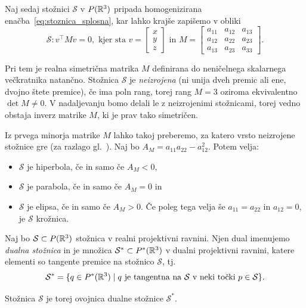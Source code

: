 Naj sedaj stožnici $\mathcal{S}$ v $P(\mathbb R^3)$ pripada homogenizirana enačba~\eqref{eq:stoznica_splosna}, kar lahko krajše zapišemo v obliki
\begin{equation}
    \label{eq:stoznica_matricna}
    \mathcal{S}: v^\intercal M v = 0,
    \text{ kjer sta } v =
    \begin{bmatrix}
        x\\
        y\\
        z
    \end{bmatrix}
    \text{ in } M =
    \begin{bmatrix}
        a_{11} & a_{12} & a_{13}\\
        a_{12} & a_{22} & a_{23}\\
        a_{13} & a_{23} & a_{33}
    \end{bmatrix}.
\end{equation}

Pri tem je realna simetrična matrika $M$ definirana do neničelnega skalarnega večkratnika natančno. Stožnica $\mathcal{S}$ je \emph{neizrojena} (ni unija dveh premic ali ene, dvojno štete premice), če ima poln rang, torej rang $ M = 3$ oziroma ekvivalentno $\det M \neq 0$. V nadaljevanju bomo delali le z neizrojenimi stožnicami, torej vedno obstaja inverz matrike $M$, ki je prav tako simetričen.

Iz prvega minorja matrike $M$ lahko takoj preberemo, za katero vrsto neizrojene stožnice gre (za razlago gl.\ \cite{sivic2020}). Naj bo $A_M = a_{11}a_{22} - a_{12}^2$. Potem velja:
\begin{itemize}
    \item $\mathcal{S}$ je hiperbola, če in samo če $A_M < 0$,
    \item $\mathcal{S}$ je parabola, če in samo če $A_M = 0$ in
    \item $\mathcal{S}$ je elipsa, če in samo če $A_M > 0$. Če poleg tega velja še $a_{11} = a_{22}$ in $a_{12} = 0$, je $\mathcal{S}$ krožnica.
\end{itemize}

\begin{definicija}
    Naj bo $\mathcal{S} \subset P(\mathbb R^3)$ stožnica v realni projektivni ravnini. Njen dual imenujemo \emph{dualna stožnica} in je množica $\mathcal{S}^* \subset P^*(\mathbb R^3)$ v dualni projektivni ravnini, katere elementi so tangente premice na stožnico $\mathcal{S}$, tj.\
    $$ \mathcal{S}^* = \{ q \in P^*(\mathbb R^3) \; | \; q \text{ je tangentna na } \mathcal{S} \text{ v neki točki } p \in \mathcal{S} \}.$$
\end{definicija}
\begin{opomba}
    Stožnica $\mathcal{S}$ je torej ovojnica dualne stožnice $\mathcal{S}^*$.
\end{opomba}

